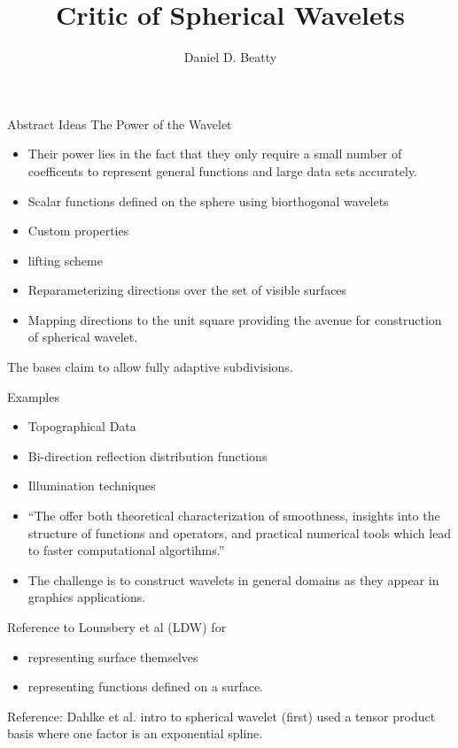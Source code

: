 \documentclass[11pt]{article}
\title{Critic of Spherical Wavelets}
\author{Daniel D. Beatty}
\begin{document}
\maketitle

Abstract Ideas The Power of the Wavelet

\begin{itemize}
\item Their power lies in the fact that they only require a small number of coefficents to represent general functions and large data sets accurately.
\item Scalar functions defined on the sphere using biorthogonal wavelets
\item Custom properties 
\item lifting scheme
\item Reparameterizing directions over the set of visible surfaces
\item Mapping directions to the unit square providing the avenue for construction of spherical wavelet.
\end{itemize}

The bases claim to allow fully adaptive subdivisions.

Examples
\begin{itemize}
\item Topographical Data
\item Bi-direction reflection distribution functions
\item Illumination techniques
\item ``The offer both theoretical characterization of smoothness, insights into the structure of functions and operators, and practical numerical tools which lead to faster computational algortihms.''
\item The challenge is to construct wavelets in general domains as they appear in graphics applications.  
\end{itemize}

Reference to Lounsbery et al (LDW) for 
\begin{itemize}
\item representing surface themselves
\item representing functions defined on a surface.
\end{itemize}

Reference: Dahlke et al.  intro to spherical wavelet (first) used a tensor product basis where one factor is an exponential spline.  
\end{document}
